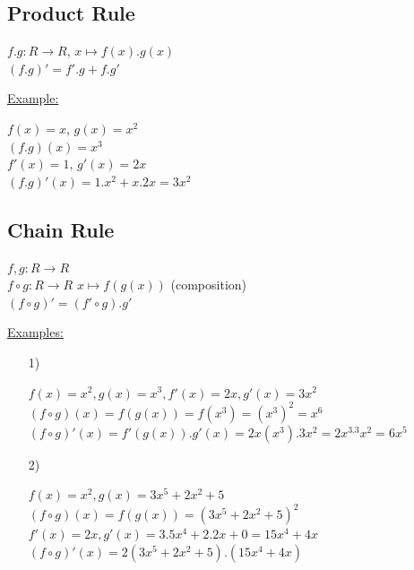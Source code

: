\documentclass[a4paper, 12pt]{article}
\begin{document}
\subsection{Product Rule}
\begin{center}
$f.g: R \rightarrow R$, $x\mapsto f(x).g(x)$\\
$(f.g)' = f'.g + f.g'$\\
\end{center}
\underline{Example:}
\begin{center}
$f(x) = x$, $g(x) = x^2$\\
$(f.g)(x) = x^3$\\
$f'(x) = 1$, $g'(x) = 2x$\\
$(f.g)'(x) = 1.x^2+x.2x = 3x^2$\\
\end{center}

\subsection{Chain Rule}
\begin{center}
$f,g : R \rightarrow R$\\
$f\circ g : R \rightarrow R$ 	$x \mapsto f(g(x))$ (composition)\\
$(f\circ g)' = (f'\circ g).g'$\\
\end{center}
\underline{Examples:}\\
\begin{enumerate}
\item[1)]
\begin{center}
$f(x) = x^2, g(x) = x^3, f'(x) = 2x, g'(x) = 3x^2$\\
$(f \circ g)(x) = f(g(x)) = f(x^3) = (x^3)^2 = x^6$\\
$(f \circ g)'(x) = f'(g(x)).g'(x) = 2x(x^3).3x^2 = 2x^3.3x^2 = 6x^5$\\
\end{center}
\item[2)]
\begin{center}
$f(x) = x^2,  g(x) = 3x^5 + 2x^2 +5$\\
$(f \circ g)(x) = f(g(x)) = (3x^5+2x^2+5)^2$\\
$f'(x) = 2x, g'(x)= 3.5x^4 + 2.2x + 0 = 15x^4 + 4x$\\
$(f \circ g)'(x) = 2(3x^5 + 2x^2 + 5).(15x^4+4x)$\\
\end{center}
\end{enumerate}
\end{document}
